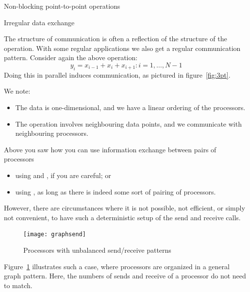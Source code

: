 
 {Non-blocking point-to-point operations}
\label{sec:nonblock}

 {Irregular data exchange}

The structure of communication is often a reflection of the structure
of the operation.
With some regular applications we also get a regular communication pattern.
Consider again the above operation:
\[ y_i=x_{i-1}+x_i+x_{i+1}\colon i=1,\ldots,N-1 \]
Doing this in parallel induces communication, as pictured in figure~\ref{fig:3pt}.


We note:
\begin{itemize}
\item The data is one-dimensional, and we have a linear ordering of the processors.
\item The operation involves neighbouring data points, and we communicate
  with neighbouring processors.
\end{itemize}

Above you saw how you can use information exchange between pairs of processors
\begin{itemize}
\item using  and , if you are careful; or
\item using , as long as there is indeed some sort of pairing of processors.
\end{itemize}
However, there are circumstances where it is not possible, not efficient, or simply not
convenient, to have such a deterministic setup of the send and receive calls.
%
\begin{figure}
  \texttt{[image: graphsend]}
  \caption{Processors with unbalanced send/receive patterns}
  \label{fig:graphsend}
\end{figure}
%
Figure~\ref{fig:graphsend} illustrates such a case, where processors are
organized in a general graph pattern. Here, the numbers of sends and receive
of a processor do not need to match.


